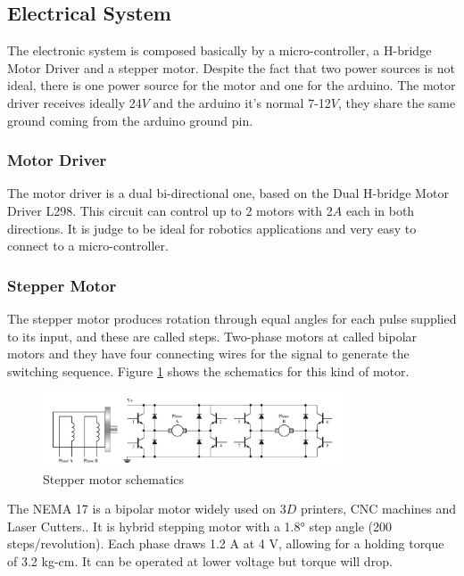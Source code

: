 \documentclass[transmag]{IEEEtran}
\begin{document}
\subsection{Electrical System}

The electronic system is composed basically by a micro-controller, a H-bridge Motor Driver and a stepper motor. Despite the fact that two power sources is not ideal, there is one power source for the motor and one for the arduino. The motor driver receives ideally 24$V$ and the arduino it's normal  7-12$V$, they share the same ground coming from the arduino ground pin. 


\subsubsection{Motor Driver}


The motor driver is a dual bi-directional one, based on the Dual H-bridge Motor Driver L298. This circuit can control up to 2 motors with 2$A$ each in both directions. It is judge to be ideal for robotics applications and very easy to connect to a micro-controller. \cite{ref2}


\subsubsection{Stepper Motor}

The stepper motor produces rotation through equal angles for each pulse supplied to its input, and these are called steps. Two-phase motors at called bipolar motors and they have four connecting wires for the signal to generate the switching sequence. Figure \ref{ASS4-Stepper} shows the schematics for this kind of motor. \cite{ref3}

\begin{figure}[H]
\centerline{\includegraphics[width=3.5in]{./images/ASS4-Stepper}}
\caption{Stepper motor schematics\label{ASS4-Stepper}}
\end{figure}

The NEMA 17 is a bipolar motor widely used on $3D$ printers, CNC machines and Laser Cutters..\cite{ref5} It is hybrid stepping motor with a 1.8° step angle (200 steps/revolution). Each phase draws 1.2 A at 4 V, allowing for a holding torque of 3.2 kg-cm. It can be operated at lower voltage but torque will drop.
\end{document}
